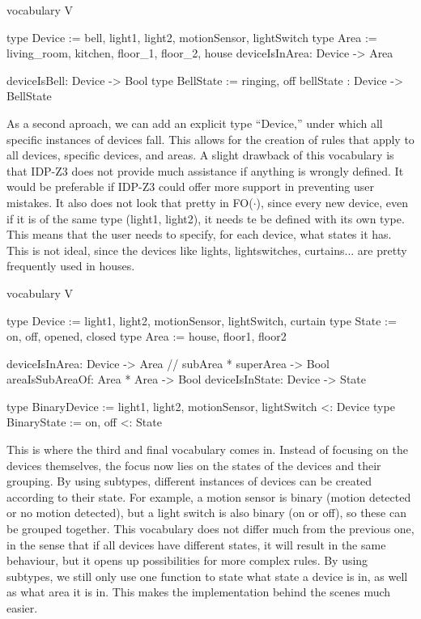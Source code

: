 \documentclass[11pt,a4paper]{report}
\newcommand{\fodot}{FO($\cdot$)\xspace}
\begin{document}
\begin{idplisting}
vocabulary V {
    type Device := {bell, light1, light2, motionSensor, lightSwitch}
    type Area := {living_room, kitchen, floor_1, floor_2, house}
    deviceIsInArea: Device -> Area

    deviceIsBell: Device -> Bool
    type BellState := {ringing, off}
    bellState : Device -> BellState
}
\end{idplisting}

As a second aproach, we can add an explicit type ``Device,'' under which all specific instances of devices fall. This allows for the creation of rules that apply to all devices, specific devices, and areas. A slight drawback of this vocabulary is that IDP-Z3 does not provide much assistance if anything is wrongly defined. It would be preferable if IDP-Z3 could offer more support in preventing user mistakes. It also does not look that pretty in \fodot, since every new device, even if it is of the same type (light1, light2), it needs te be defined with its own type. This means that the user needs to specify, for each device, what states it has. This is not ideal, since the devices like lights, lightswitches, curtains... are pretty frequently used in houses.

\begin{idplisting}
vocabulary V {
    type Device := {light1, light2, motionSensor, lightSwitch, curtain}
    type State := {on, off, opened, closed}
    type Area := {house, floor1, floor2}

    deviceIsInArea: Device -> Area
    // subArea * superArea -> Bool
    areaIsSubAreaOf: Area * Area -> Bool
    deviceIsInState: Device -> State

    type BinaryDevice := {light1, light2, motionSensor, lightSwitch} <: Device
    type BinaryState := {on, off} <: State
}
\end{idplisting}

This is where the third and final vocabulary comes in. Instead of focusing on the devices themselves, the focus now lies on the states of the devices and their grouping. By using subtypes, different instances of devices can be created according to their state. For example, a motion sensor is binary (motion detected or no motion detected), but a light switch is also binary (on or off), so these can be grouped together. This vocabulary does not differ much from the previous one, in the sense that if all devices have different states, it will result in the same behaviour, but it opens up possibilities for more complex rules. By using subtypes, we still only use one function to state what state a device is in, as well as what area it is in. This makes the implementation behind the scenes much easier.
\end{document}
